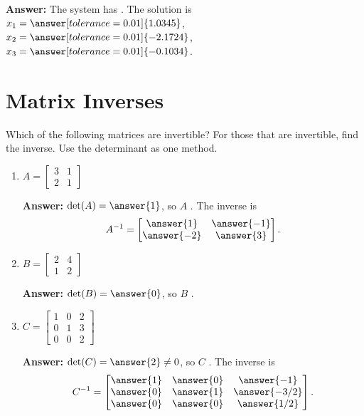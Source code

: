 \documentclass{ximera}
\begin{document}
\begin{example}
\begin{enumerate}
        \textbf{Answer:} The system has . The solution is $x_1 = \answer[tolerance=0.01]{1.0345}$, $x_2 = \answer[tolerance=0.01]{-2.1724}$, $x_3 = \answer[tolerance=0.01]{-0.1034}$.
    \end{enumerate}
\end{example}


\section*{Matrix Inverses}

\begin{example}
    Which of the following matrices are invertible? For those that are invertible, find the inverse. Use the determinant as one method.
    \begin{enumerate}
        \item $A = \begin{bmatrix} 3 & 1 \\ 2 & 1 \end{bmatrix}$

        \textbf{Answer:} $\det(A) = \answer{1}$, so $A$ . The inverse is
        \[
        A^{-1} = \begin{bmatrix} \answer{1} & \answer{-1} \\ \answer{-2} & \answer{3} \end{bmatrix}.
        \]

        \item $B = \begin{bmatrix} 2 & 4 \\ 1 & 2 \end{bmatrix}$

        \textbf{Answer:} $\det(B) = \answer{0}$, so $B$ .

        \item $C = \begin{bmatrix} 1 & 0 & 2 \\ 0 & 1 & 3 \\ 0 & 0 & 2 \end{bmatrix}$

        \textbf{Answer:} $\det(C) = \answer{2} \neq 0$, so $C$ . The inverse is
        \[
        C^{-1} = \begin{bmatrix} \answer{1} & \answer{0} & \answer{-1} \\ \answer{0} & \answer{1} & \answer{-3/2} \\ \answer{0} & \answer{0} & \answer{1/2} \end{bmatrix}.
        \]


\end{enumerate}
\end{example}
\end{document}
